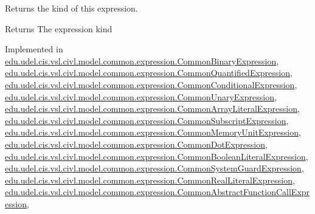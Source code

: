 Returns the kind of this expression. 

\begin{DoxyReturn}{Returns}
The expression kind 
\end{DoxyReturn}


Implemented in \hyperlink{classedu_1_1udel_1_1cis_1_1vsl_1_1civl_1_1model_1_1common_1_1expression_1_1CommonBinaryExpression_a326f47b64ac5dbb8ebf847701d9f7a1c}{edu.\+udel.\+cis.\+vsl.\+civl.\+model.\+common.\+expression.\+Common\+Binary\+Expression}, \hyperlink{classedu_1_1udel_1_1cis_1_1vsl_1_1civl_1_1model_1_1common_1_1expression_1_1CommonQuantifiedExpression_aa7b33d27acdeadf4bdeabee3e141d9c1}{edu.\+udel.\+cis.\+vsl.\+civl.\+model.\+common.\+expression.\+Common\+Quantified\+Expression}, \hyperlink{classedu_1_1udel_1_1cis_1_1vsl_1_1civl_1_1model_1_1common_1_1expression_1_1CommonConditionalExpression_a4f4a227bab81336e4115e0283c6e0c0c}{edu.\+udel.\+cis.\+vsl.\+civl.\+model.\+common.\+expression.\+Common\+Conditional\+Expression}, \hyperlink{classedu_1_1udel_1_1cis_1_1vsl_1_1civl_1_1model_1_1common_1_1expression_1_1CommonUnaryExpression_a6f6a3387b3027d7385d287ae28aaaca5}{edu.\+udel.\+cis.\+vsl.\+civl.\+model.\+common.\+expression.\+Common\+Unary\+Expression}, \hyperlink{classedu_1_1udel_1_1cis_1_1vsl_1_1civl_1_1model_1_1common_1_1expression_1_1CommonArrayLiteralExpression_a7e6edc60e469a2c03a6da8a07ffa5274}{edu.\+udel.\+cis.\+vsl.\+civl.\+model.\+common.\+expression.\+Common\+Array\+Literal\+Expression}, \hyperlink{classedu_1_1udel_1_1cis_1_1vsl_1_1civl_1_1model_1_1common_1_1expression_1_1CommonSubscriptExpression_ae4330a9ed3afe3a704504f4a539e77c5}{edu.\+udel.\+cis.\+vsl.\+civl.\+model.\+common.\+expression.\+Common\+Subscript\+Expression}, \hyperlink{classedu_1_1udel_1_1cis_1_1vsl_1_1civl_1_1model_1_1common_1_1expression_1_1CommonMemoryUnitExpression_a2475c2ec05be0be23c6a2141df5f34c8}{edu.\+udel.\+cis.\+vsl.\+civl.\+model.\+common.\+expression.\+Common\+Memory\+Unit\+Expression}, \hyperlink{classedu_1_1udel_1_1cis_1_1vsl_1_1civl_1_1model_1_1common_1_1expression_1_1CommonDotExpression_a80dce36fd45d170543d2549774c1630d}{edu.\+udel.\+cis.\+vsl.\+civl.\+model.\+common.\+expression.\+Common\+Dot\+Expression}, \hyperlink{classedu_1_1udel_1_1cis_1_1vsl_1_1civl_1_1model_1_1common_1_1expression_1_1CommonBooleanLiteralExpression_adbf18c1a65c9cb68231f5f62fa4e7e50}{edu.\+udel.\+cis.\+vsl.\+civl.\+model.\+common.\+expression.\+Common\+Boolean\+Literal\+Expression}, \hyperlink{classedu_1_1udel_1_1cis_1_1vsl_1_1civl_1_1model_1_1common_1_1expression_1_1CommonSystemGuardExpression_a28f73a477b739c9a6d373f9054df0069}{edu.\+udel.\+cis.\+vsl.\+civl.\+model.\+common.\+expression.\+Common\+System\+Guard\+Expression}, \hyperlink{classedu_1_1udel_1_1cis_1_1vsl_1_1civl_1_1model_1_1common_1_1expression_1_1CommonRealLiteralExpression_ad871c030a6277bbf83da8b17edcfec58}{edu.\+udel.\+cis.\+vsl.\+civl.\+model.\+common.\+expression.\+Common\+Real\+Literal\+Expression}, \hyperlink{classedu_1_1udel_1_1cis_1_1vsl_1_1civl_1_1model_1_1common_1_1expression_1_1CommonAbstractFunctionCallExpression_a5fdc82fb55e61879f9e71d89ef7914eb}{edu.\+udel.\+cis.\+vsl.\+civl.\+model.\+common.\+expression.\+Common\+Abstract\+Function\+Call\+Expression}, 